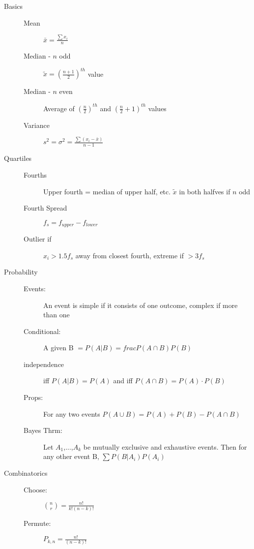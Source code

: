\documentclass[12pt]{letter}
\begin{document}
\begin{multicols}{2}
\begin{description}
  \item[Basics]
    \begin{description}
    \item[Mean] $\bar{x} = \frac{\sum x_i}{n}$
    \item[Median - $n$ odd] $\tilde{x} = \left( \frac{n+1}{2} \right)^{th}$ value
    \item[Median - $n$ even] Average of $\left( \frac{n}{2} \right)^{th}$ and $\left( \frac{n}{2} + 1\right)^{th}$ values
    \item[Variance] $s^2 = \sigma^2 = \frac{\sum(x_i - \bar{x})}{n-1}$
    \end{description}

  \item[Quartiles]
    \begin{description}
    \item[Fourths] Upper fourth = median of upper half, etc.  $\tilde{x}$ in both halfves if $n$ odd
    \item[Fourth Spread] $f_s = f_{upper} - f_{lower}$
    \item[Outlier if] $x_i > 1.5f_s$ away from closest fourth, extreme if $> 3f_s$  
    \end{description}

  \item[Probability]
    \begin{description}
    \item[Events:] An event is simple if it consists of one outcome, complex if more than one
    \item[Conditional:] A given B $ = P(A|B) = frac{P(A \cap B)}{P(B)}$
    \item[independence] iff $P(A|B) = P(A)$ and iff $P(A \cap B) = P(A)\cdot P(B)$
    \item[Props:]For any two events $P(A \cup B) = P(A) + P(B) - P(A \cap B)$
    \item[Bayes Thrm:] Let $A_1$,...,$A_k$ be mutually exclusive and exhaustive events. Then for any other event B, $\sum P(B|A_i)P(A_i)$
    \end{description}

  \item[Combinatorics]
    \begin{description}
    \item[Choose:] ${n \choose r} = \frac{n!}{k!(n-k)!}$
    \item[Permute:] $P_{k,n} = \frac{n!}{(n-k)!}$
    \end{description}


\end{description}
\end{multicols}
\end{document}
